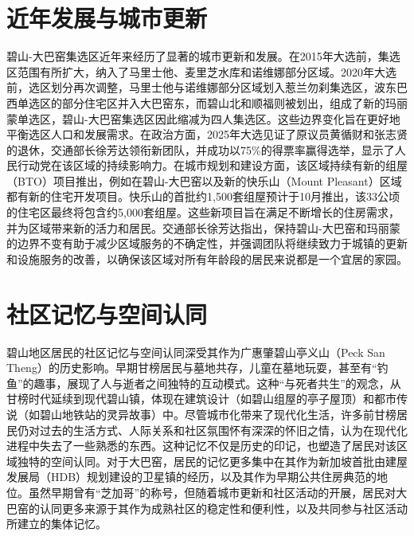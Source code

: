 \documentclass[11pt,a4paper,twoside,openany]{book}
\begin{document}
\section{近年发展与城市更新}
碧山-大巴窑集选区近年来经历了显著的城市更新和发展。在2015年大选前，集选区范围有所扩大，纳入了马里士他、麦里芝水库和诺维娜部分区域。2020年大选前，选区划分再次调整，马里士他与诺维娜部分区域划入惹兰勿刹集选区，波东巴西单选区的部分住宅区并入大巴窑东，而碧山北和顺福则被划出，组成了新的玛丽蒙单选区，碧山-大巴窑集选区因此缩减为四人集选区。这些边界变化旨在更好地平衡选区人口和发展需求。在政治方面，2025年大选见证了原议员黄循财和张志贤的退休，交通部长徐芳达领衔新团队，并成功以75\%的得票率赢得选举，显示了人民行动党在该区域的持续影响力。在城市规划和建设方面，该区域持续有新的组屋（BTO）项目推出，例如在碧山-大巴窑以及新的快乐山（Mount Pleasant）区域都有新的住宅开发项目。快乐山的首批约1,500套组屋预计于10月推出，该33公顷的住宅区最终将包含约5,000套组屋。这些新项目旨在满足不断增长的住房需求，并为区域带来新的活力和居民。交通部长徐芳达指出，保持碧山-大巴窑和玛丽蒙的边界不变有助于减少区域服务的不确定性，并强调团队将继续致力于城镇的更新和设施服务的改善，以确保该区域对所有年龄段的居民来说都是一个宜居的家园。

\section{社区记忆与空间认同}
碧山地区居民的社区记忆与空间认同深受其作为广惠肇碧山亭义山（Peck San Theng）的历史影响。早期甘榜居民与墓地共存，儿童在墓地玩耍，甚至有“钓鱼”的趣事，展现了人与逝者之间独特的互动模式。这种“与死者共生”的观念，从甘榜时代延续到现代碧山镇，体现在建筑设计（如碧山组屋的亭子屋顶）和都市传说（如碧山地铁站的灵异故事）中。尽管城市化带来了现代化生活，许多前甘榜居民仍对过去的生活方式、人际关系和社区氛围怀有深深的怀旧之情，认为在现代化进程中失去了一些熟悉的东西。这种记忆不仅是历史的印记，也塑造了居民对该区域独特的空间认同。对于大巴窑，居民的记忆更多集中在其作为新加坡首批由建屋发展局（HDB）规划建设的卫星镇的经历，以及其作为早期公共住房典范的地位。虽然早期曾有“芝加哥”的称号，但随着城市更新和社区活动的开展，居民对大巴窑的认同更多来源于其作为成熟社区的稳定性和便利性，以及共同参与社区活动所建立的集体记忆。
\end{document}
